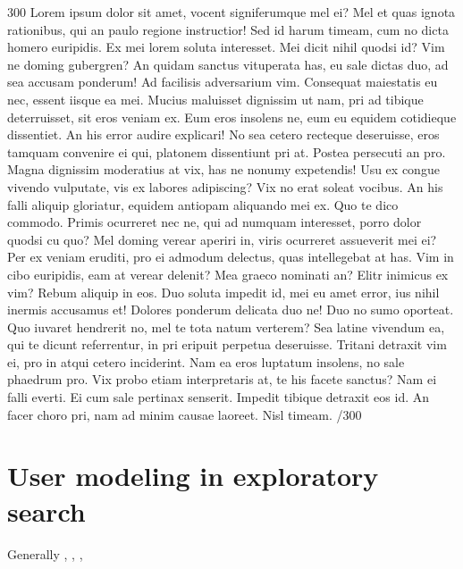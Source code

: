 \documentclass{sigchi}
\begin{document}
300 Lorem ipsum dolor sit amet, vocent signiferumque mel ei? Mel et quas ignota rationibus, qui an paulo regione instructior! Sed id harum timeam, cum no dicta homero euripidis. Ex mei lorem soluta interesset. Mei dicit nihil quodsi id? Vim ne doming gubergren? An quidam sanctus vituperata has, eu sale dictas duo, ad sea accusam ponderum! Ad facilisis adversarium vim. Consequat maiestatis eu nec, essent iisque ea mei. Mucius maluisset dignissim ut nam, pri ad tibique deterruisset, sit eros veniam ex. Eum eros insolens ne, eum eu equidem cotidieque dissentiet. An his error audire explicari! No sea cetero recteque deseruisse, eros tamquam convenire ei qui, platonem dissentiunt pri at. Postea persecuti an pro. Magna dignissim moderatius at vix, has ne nonumy expetendis! Usu ex congue vivendo vulputate, vis ex labores adipiscing? Vix no erat soleat vocibus. An his falli aliquip gloriatur, equidem antiopam aliquando mei ex. Quo te dico commodo. Primis ocurreret nec ne, qui ad numquam interesset, porro dolor quodsi cu quo? Mel doming verear aperiri in, viris ocurreret assueverit mei ei? Per ex veniam eruditi, pro ei admodum delectus, quas intellegebat at has. Vim in cibo euripidis, eam at verear delenit? Mea graeco nominati an? Elitr inimicus ex vim? Rebum aliquip in eos. Duo soluta impedit id, mei eu amet error, ius nihil inermis accusamus et! Dolores ponderum delicata duo ne! Duo no sumo oporteat. Quo iuvaret hendrerit no, mel te tota natum verterem? Sea latine vivendum ea, qui te dicunt referrentur, in pri eripuit perpetua deseruisse. Tritani detraxit vim ei, pro in atqui cetero inciderint. Nam ea eros luptatum insolens, no sale phaedrum pro. Vix probo etiam interpretaris at, te his facete sanctus? Nam ei falli everti. Ei cum sale pertinax senserit. Impedit tibique detraxit eos id. An facer choro pri, nam ad minim causae laoreet. Nisl timeam. /300

\section{User modeling in exploratory search}
Generally
\cite{oconnor10}, \cite{sugi04}, \cite{white07}, \cite{kules09}
\end{document}
